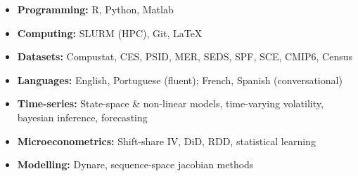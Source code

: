 \documentclass{practical-resume}
\begin{document}
\noindent
\begin{minipage}[t]{0.48\textwidth}
\begin{itemize}[leftmargin=*, itemsep=0em, topsep=0.3em]
    \item \textbf{Programming:} R, Python, Matlab
    \item \textbf{Computing:} SLURM (HPC), Git, \LaTeX
    \item \textbf{Datasets:} Compustat, CES, PSID, MER, SEDS, SPF, SCE, CMIP6, Census
    \item \textbf{Languages:} English, Portuguese (fluent); French, Spanish (conversational)
\end{itemize}
\end{minipage}%
\hfill%
\begin{minipage}[t]{0.48\textwidth}
\begin{itemize}[leftmargin=0.25em, itemsep=0.25em, topsep=0.3em]
    \item \textbf{Time-series:} State-space \& non-linear models, time-varying volatility, bayesian inference, forecasting
    \item \textbf{Microeconometrics:} Shift-share IV, DiD, RDD, statistical learning
    \item \textbf{Modelling:} Dynare, sequence-space jacobian methods
\end{itemize}
\end{minipage}


		
\end{document}
